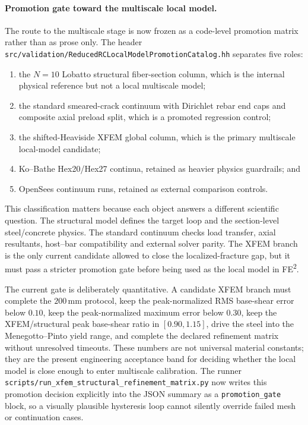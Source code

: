 \paragraph{Promotion gate toward the multiscale local model.}
The route to the multiscale stage is now frozen as a code-level promotion
matrix rather than as prose only.  The header
\texttt{src/validation/ReducedRCLocalModelPromotionCatalog.hh} separates five
roles:
\begin{enumerate}
  \item the \(N=10\) Lobatto structural fiber-section column, which is the
    internal physical reference but not a local multiscale model;
  \item the standard smeared-crack continuum with Dirichlet rebar end caps and
    composite axial preload split, which is a promoted regression control;
  \item the shifted-Heaviside XFEM global column, which is the primary
    multiscale local-model candidate;
  \item Ko--Bathe Hex20/Hex27 continua, retained as heavier physics
    guardrails; and
  \item OpenSees continuum runs, retained as external comparison controls.
\end{enumerate}
This classification matters because each object answers a different scientific
question.  The structural model defines the target loop and the section-level
steel/concrete physics.  The standard continuum checks load transfer, axial
resultants, host--bar compatibility and external solver parity.  The XFEM
branch is the only current candidate allowed to close the localized-fracture
gap, but it must pass a stricter promotion gate before being used as the local
model in FE\textsuperscript{2}.

The current gate is deliberately quantitative.  A candidate XFEM branch must
complete the \(200\,\mathrm{mm}\) protocol, keep the peak-normalized RMS
base-shear error below \(0.10\), keep the peak-normalized maximum error below
\(0.30\), keep the XFEM/structural peak base-shear ratio in
\([0.90,1.15]\), drive the steel into the Menegotto--Pinto yield range, and
complete the declared refinement matrix without unresolved timeouts.  These
numbers are not universal material constants; they are the present
engineering acceptance band for deciding whether the local model is close
enough to enter multiscale calibration.  The runner
\texttt{scripts/run\_xfem\_structural\_refinement\_matrix.py} now writes this
promotion decision explicitly into the JSON summary as a
\texttt{promotion\_gate} block, so a visually plausible hysteresis loop cannot
silently override failed mesh or continuation cases.

